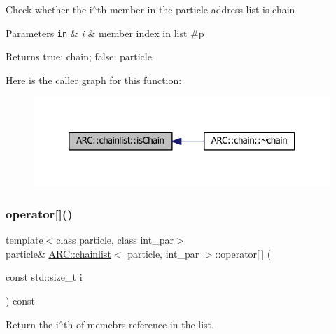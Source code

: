 Check whether the i$^\wedge$th member in the particle address list is chain 
\begin{DoxyParams}[1]{Parameters}
\mbox{\tt in}  & {\em i} & member index in list \#p \\
\hline
\end{DoxyParams}
\begin{DoxyReturn}{Returns}
true\+: chain; false\+: particle 
\end{DoxyReturn}
Here is the caller graph for this function\+:
\nopagebreak
\begin{figure}[H]
\begin{center}
\leavevmode
\includegraphics[width=332pt]{classARC_1_1chainlist_af3ec0d68872c99069015fe6f5f5ba4b4_icgraph}
\end{center}
\end{figure}
\hypertarget{classARC_1_1chainlist_a260bb9c07e8d25eff6e59997c1326daf}{}\label{classARC_1_1chainlist_a260bb9c07e8d25eff6e59997c1326daf} 
\subsubsection{\texorpdfstring{operator[]()}{operator[]()}}
{\footnotesize\ttfamily template$<$class particle, class int\+\_\+par$>$ \\
particle\& \hyperlink{classARC_1_1chainlist}{A\+R\+C\+::chainlist}$<$ particle, int\+\_\+par $>$\+::operator\mbox{[}$\,$\mbox{]} (\begin{DoxyParamCaption}\item[{const std\+::size\+\_\+t}]{i }\end{DoxyParamCaption}) const\hspace{0.3cm}{\ttfamily [inline]}}



Return the i$^\wedge$th of memebr\textquotesingle{}s reference in the list. 

